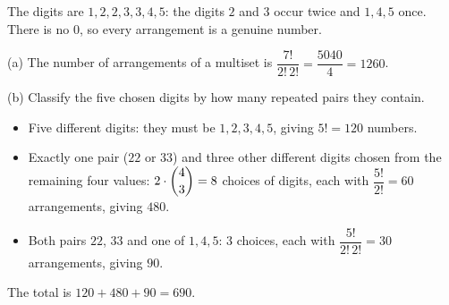 The digits are $1,2,2,3,3,4,5$: the digits $2$ and $3$ occur twice and $1,4,5$ once. There is no $0$, so every arrangement is a genuine number.

(a) The number of arrangements of a multiset is $\dfrac{7!}{2!\,2!}=\dfrac{5040}{4}=\boxed{1260}$.

(b) Classify the five chosen digits by how many repeated pairs they contain.
\begin{itemize}
\item Five different digits: they must be $1,2,3,4,5$, giving $5!=120$ numbers.
\item Exactly one pair ($22$ or $33$) and three other different digits chosen from the remaining four values: $2\cdot\dbinom43=8$ choices of digits, each with $\dfrac{5!}{2!}=60$ arrangements, giving $480$.
\item Both pairs $22$, $33$ and one of $1,4,5$: $3$ choices, each with $\dfrac{5!}{2!\,2!}=30$ arrangements, giving $90$.
\end{itemize}
The total is $120+480+90=\boxed{690}$.
